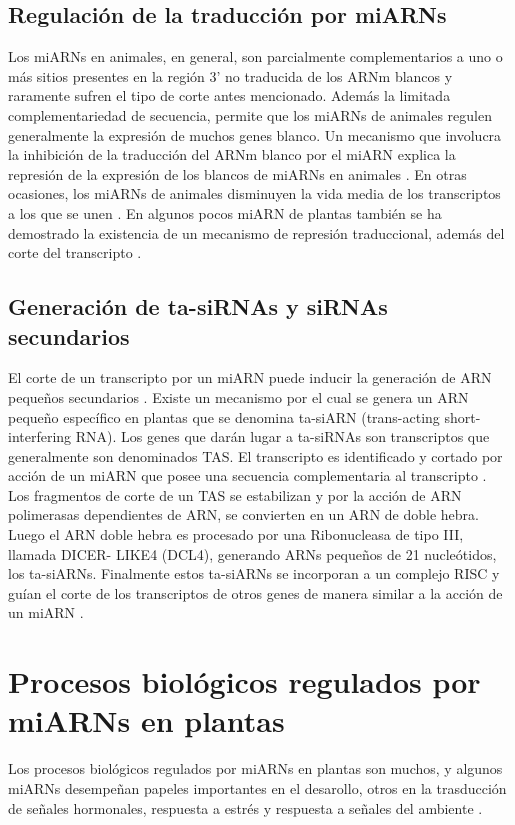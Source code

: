 \subsection{Regulación de la traducción por miARNs}

Los miARNs en animales, en general, son parcialmente complementarios a uno o más sitios presentes en la región 3’ no traducida de los ARNm blancos \citep{pmid12869753,pmid8252621,Fabian} y raramente sufren el tipo de corte antes mencionado. 
Además la limitada complementariedad de secuencia, permite que los miARNs de animales regulen generalmente la expresión de muchos genes blanco.
Un mecanismo que involucra la inhibición de la traducción del ARNm blanco por el miARN explica la represión de la expresión de los blancos de miARNs en animales \citep{Fabian}.
En otras ocasiones, los miARNs de animales disminuyen la vida media de los transcriptos a los que se unen \citep{pmid20703300}.
En algunos pocos miARN de plantas también se ha demostrado la existencia de un mecanismo de represión traduccional, además del corte del transcripto \citep{Schwab2005517,pmid19531599,pmid18392778,pmid18483398,pmid12893888,pmid14555699}.

\subsection{Generación de ta-siRNAs y siRNAs secundarios}
El corte de un transcripto por un miARN puede inducir la generación de ARN pequeños secundarios \citep{Allen2005207, pmid19066226,pmid19066226,pmid20643946,pmid20562854,pmid22308502}.
Existe un mecanismo por el cual se genera un ARN pequeño específico en plantas que se denomina ta-siARN (trans-acting short-interfering RNA).
Los genes que darán lugar a ta-siRNAs son transcriptos que generalmente son denominados TAS.
El transcripto es identificado y cortado por acción de un miARN que posee una secuencia complementaria al transcripto \citep{Allen2005207}.
Los fragmentos de corte de un TAS se estabilizan y por la acción de ARN polimerasas dependientes de ARN, se convierten en un ARN de doble hebra.
Luego el ARN doble hebra es procesado por una Ribonucleasa de tipo III, llamada DICER- LIKE4 (DCL4), generando ARNs pequeños de 21 nucleótidos, los ta-siARNs.
Finalmente estos ta-siARNs se incorporan a un complejo RISC y guían el corte de los transcriptos de otros genes de manera similar a la acción de un miARN \citep{Allen2005207,pmid16040244,pmid16131612,Xie2005a}.

\section{Procesos biológicos regulados por miARNs en plantas}
Los procesos biológicos regulados por miARNs en plantas son muchos, y algunos miARNs desempeñan papeles importantes en el desarollo, otros en la trasducción de señales hormonales, respuesta a estrés y respuesta a señales del ambiente \citep{Voinnet2009669, pmid21466971, pmid19699140}.

